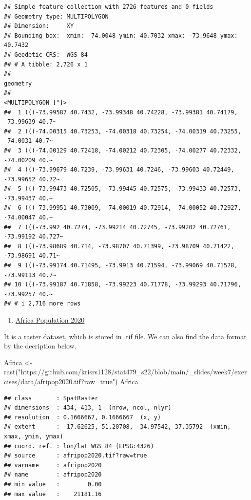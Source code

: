 \documentclass[
]{article}
\newenvironment{Shaded}{\begin{snugshade}}{\end{snugshade}}
\newcommand{\FunctionTok}[1]{\textcolor[rgb]{0.00,0.00,0.00}{#1}}
\newcommand{\NormalTok}[1]{#1}
\newcommand{\OtherTok}[1]{\textcolor[rgb]{0.56,0.35,0.01}{#1}}
\newcommand{\StringTok}[1]{\textcolor[rgb]{0.31,0.60,0.02}{#1}}
\providecommand{\tightlist}{%
  \setlength{\itemsep}{0pt}\setlength{\parskip}{0pt}}
\begin{document}
\begin{verbatim}
## Simple feature collection with 2726 features and 0 fields
## Geometry type: MULTIPOLYGON
## Dimension:     XY
## Bounding box:  xmin: -74.0048 ymin: 40.7032 xmax: -73.9648 ymax: 40.7432
## Geodetic CRS:  WGS 84
## # A tibble: 2,726 x 1
##                                                                         geometry
##                                                               <MULTIPOLYGON [°]>
##  1 (((-73.99587 40.7432, -73.99348 40.74228, -73.99381 40.74179, -73.99639 40.7~
##  2 (((-74.00315 40.73253, -74.00318 40.73254, -74.00319 40.73255, -74.0031 40.7~
##  3 (((-74.00129 40.72418, -74.00212 40.72305, -74.00277 40.72332, -74.00209 40.~
##  4 (((-73.99679 40.7239, -73.99631 40.7246, -73.99603 40.72449, -73.99652 40.72~
##  5 (((-73.99473 40.72505, -73.99445 40.72575, -73.99433 40.72573, -73.99437 40.~
##  6 (((-73.99951 40.73009, -74.00019 40.72914, -74.00052 40.72927, -74.00047 40.~
##  7 (((-73.992 40.7274, -73.99214 40.72745, -73.99202 40.72761, -73.99192 40.727~
##  8 (((-73.98689 40.714, -73.98707 40.71399, -73.98709 40.71422, -73.98691 40.71~
##  9 (((-73.99174 40.71495, -73.9913 40.71594, -73.99069 40.71578, -73.99113 40.7~
## 10 (((-73.99187 40.71858, -73.99223 40.71778, -73.99293 40.71796, -73.99257 40.~
## # i 2,716 more rows
\end{verbatim}

\begin{enumerate}
\def\labelenumi{\alph{enumi}.}
\setcounter{enumi}{1}
\tightlist
\item
  \href{https://github.com/krisrs1128/stat479_s22/blob/main/_slides/week7/exercises/data/afripop2020.tif?raw=true}{Africa
  Population 2020}
\end{enumerate}

It is a raster dataset, which is stored in .tif file. We can also find
the data format by the decription below.

\begin{Shaded}
\begin{Highlighting}[]
\NormalTok{Africa }\OtherTok{\textless{}{-}} \FunctionTok{rast}\NormalTok{(}\StringTok{"https://github.com/krisrs1128/stat479\_s22/blob/main/\_slides/week7/exercises/data/afripop2020.tif?raw=true"}\NormalTok{)}
\NormalTok{Africa}
\end{Highlighting}
\end{Shaded}

\begin{verbatim}
## class       : SpatRaster 
## dimensions  : 434, 413, 1  (nrow, ncol, nlyr)
## resolution  : 0.1666667, 0.1666667  (x, y)
## extent      : -17.62625, 51.20708, -34.97542, 37.35792  (xmin, xmax, ymin, ymax)
## coord. ref. : lon/lat WGS 84 (EPSG:4326) 
## source      : afripop2020.tif?raw=true 
## varname     : afripop2020 
## name        : afripop2020 
## min value   :        0.00 
## max value   :    21181.16
\end{verbatim}
\end{document}
